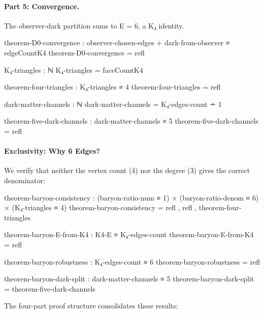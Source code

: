 \documentclass[11pt,a4paper]{book}
\begin{document}
\paragraph{Part 5: Convergence.}
The observer-dark partition sums to E = 6, a K₄ identity.

\begin{code}
theorem-D0-convergence : observer-chosen-edges + dark-from-observer ≡ edgeCountK4
theorem-D0-convergence = refl

K₄-triangles : ℕ
K₄-triangles = faceCountK4

theorem-four-triangles : K₄-triangles ≡ 4
theorem-four-triangles = refl

dark-matter-channels : ℕ
dark-matter-channels = K₄-edges-count ∸ 1

theorem-five-dark-channels : dark-matter-channels ≡ 5
theorem-five-dark-channels = refl
\end{code}

\paragraph{Exclusivity: Why 6 Edges?}

We verify that neither the vertex count (4) nor the degree (3) gives the correct denominator:

\begin{code}
theorem-baryon-consistency : (baryon-ratio-num ≡ 1)
                           × (baryon-ratio-denom ≡ 6)
                           × (K₄-triangles ≡ 4)
theorem-baryon-consistency = refl
                           , refl
                           , theorem-four-triangles

theorem-baryon-E-from-K4 : K4-E ≡ K₄-edges-count
theorem-baryon-E-from-K4 = refl

theorem-baryon-robustness : K₄-edges-count ≡ 6
theorem-baryon-robustness = refl

theorem-baryon-dark-split : dark-matter-channels ≡ 5
theorem-baryon-dark-split = theorem-five-dark-channels
\end{code}

The four-part proof structure consolidates these results:
\end{document}
